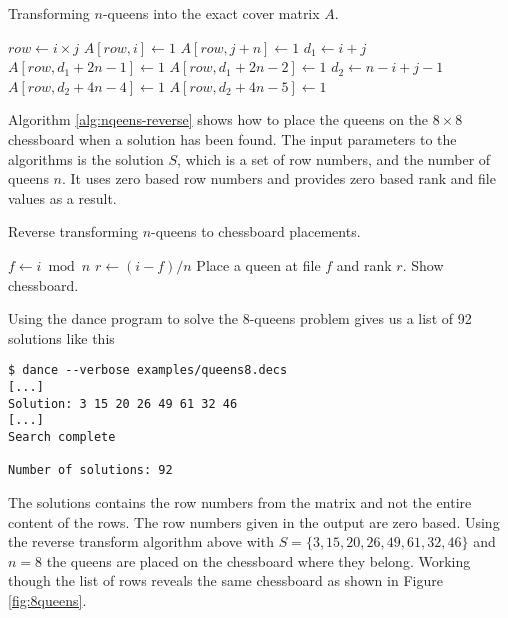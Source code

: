 \begin{algorithm}[H]
	\caption{Transforming $n$-queens into the exact cover matrix $A$.}
	\label{alg:nqeens-cover}
	\begin{distribalgo}[1]
					\STATE $row \leftarrow i \times j$
					\STATE $A[row,i] \leftarrow 1$  
					\STATE $A[row,j+n] \leftarrow 1$  
					\STATE $d_1 \leftarrow i + j$  
							\STATE $A[row,d_1 + 2n - 1] \leftarrow 1$
						\ELSE
							\STATE $A[row,d_1 + 2n - 2] \leftarrow 1$
						\ENDIF
					\ENDIF
					\STATE $d_2 \leftarrow n - i + j - 1$  
							\STATE $A[row,d_2 + 4n - 4] \leftarrow 1$
						\ELSE
							\STATE $A[row,d_2 + 4n - 5] \leftarrow 1$
						\ENDIF
					\ENDIF
				\ENDFOR
			\ENDFOR
		\ENDPROC
	\end{distribalgo}
\end{algorithm}

Algorithm \ref{alg:nqeens-reverse} shows how to place the queens on the $8 \times 8$ chessboard when a solution has been found.
The input parameters to the algorithms is the solution $S$, which is a set of row numbers, and the number of queens $n$.
It uses zero based row numbers and provides zero based rank and file values as a result.
\begin{algorithm}[H]
	\caption{Reverse transforming $n$-queens to chessboard placements.}
	\label{alg:nqeens-reverse}
	\begin{distribalgo}[1]
				\STATE $f \leftarrow i \bmod n$
				\STATE $r \leftarrow (i - f) / n$
				\STATE Place a queen at file $f$ and rank $r$.
			\ENDFOR
			\STATE Show chessboard.
		\ENDPROC
	\end{distribalgo}
\end{algorithm}

\begin{example}
Using the dance program to solve the 8-queens problem gives us a list of 92 solutions like this
\begin{verbatim}
$ dance --verbose examples/queens8.decs
[...]
Solution: 3 15 20 26 49 61 32 46
[...]
Search complete

Number of solutions: 92
\end{verbatim}
The solutions contains the row numbers from the matrix and not the entire content of the rows.
The row numbers given in the output are zero based.
Using the reverse transform algorithm above with $S = \{3, 15, 20, 26, 49, 61, 32, 46\}$ and $n = 8$ the queens are placed on the chessboard where they belong.
Working though the list of rows reveals the same chessboard as shown in Figure \ref{fig:8queens}.
\end{example}




